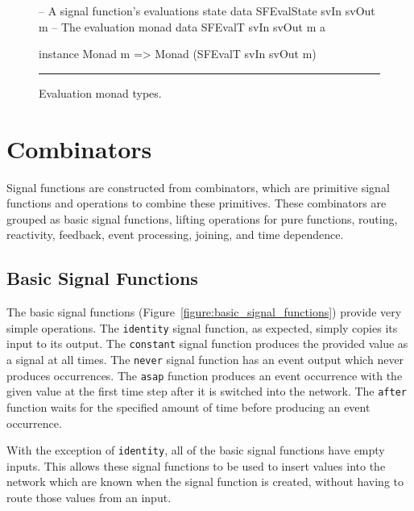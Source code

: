 \begin{figure}
\begin{code}
-- A signal function's evaluations state
data SFEvalState svIn svOut m
-- The evaluation monad
data SFEvalT svIn svOut m a

instance Monad m => Monad (SFEvalT svIn svOut m)
\end{code}
\hrule
\caption{Evaluation monad types.}
\label{figure:evaluation_monad_types}
\end{figure}

\section{Combinators}
\label{section:System_Design_and_Interface-Combinators}

Signal functions are constructed from combinators, which are primitive signal
functions and operations to combine these primitives. These combinators are
grouped as basic signal functions, lifting operations for pure functions,
routing, reactivity, feedback, event processing, joining, and time dependence.

\subsection{Basic Signal Functions}
\label{subsection:System_Design_and_Interface-Combinators-Basic_Signal_Functions}

The basic signal functions (Figure~\ref{figure:basic_signal_functions})
provide very simple operations. The {\tt identity} signal function, as expected,
simply copies its input to its output. The {\tt constant} signal function
produces the provided value as a signal at all times. The {\tt never} signal
function has an event output which never produces occurrences. The {\tt asap}
function produces an event occurrence with the given value at the first time
step after it is switched into the network. The {\tt after} function waits for
the specified amount of time before producing an event occurrence.

With the exception of {\tt identity}, all of the basic signal functions have
empty inputs. This allows these signal functions to be used to insert values
into the network which are known when the signal function is created, without
having to route those values from an input.

